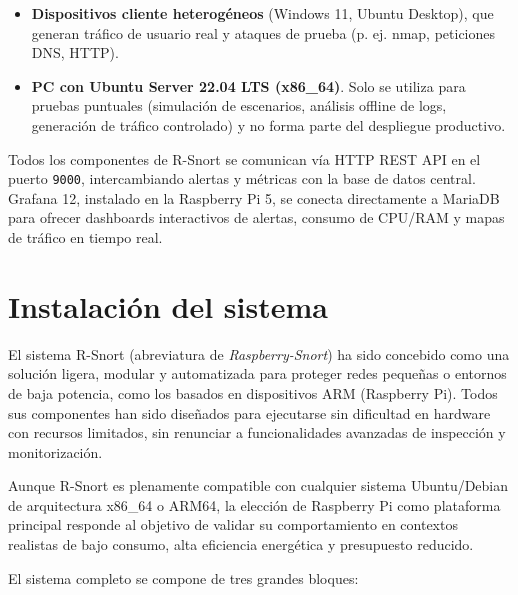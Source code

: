 \documentclass[11pt,a4paper,twoside]{report}
\begin{document}
\begin{itemize}
	\item \textbf{Dispositivos cliente heterogéneos} (Windows 11, Ubuntu Desktop), que generan tráfico de usuario real y ataques de prueba (p. ej. nmap, peticiones DNS, HTTP).
	
	\item \textbf{PC con Ubuntu Server 22.04 LTS (x86\_64)}. Solo se utiliza para pruebas puntuales (simulación de escenarios, análisis offline de logs, generación de tráfico controlado) y no forma parte del despliegue productivo.
\end{itemize}

Todos los componentes de R-Snort se comunican vía HTTP REST API en el puerto \texttt{9000}, intercambiando alertas y métricas con la base de datos central. Grafana 12, instalado en la Raspberry Pi 5, se conecta directamente a MariaDB para ofrecer dashboards interactivos de alertas, consumo de CPU/RAM y mapas de tráfico en tiempo real.

\section{Instalación del sistema}

El sistema R-Snort (abreviatura de \textit{Raspberry-Snort}) ha sido concebido como una solución ligera, modular y automatizada para proteger redes pequeñas o entornos de baja potencia, como los basados en dispositivos ARM (Raspberry Pi). Todos sus componentes han sido diseñados para ejecutarse sin dificultad en hardware con recursos limitados, sin renunciar a funcionalidades avanzadas de inspección y monitorización.\newline

Aunque R-Snort es plenamente compatible con cualquier sistema Ubuntu/Debian de arquitectura x86\_64 o ARM64, la elección de Raspberry Pi como plataforma principal responde al objetivo de validar su comportamiento en contextos realistas de bajo consumo, alta eficiencia energética y presupuesto reducido.\newline

El sistema completo se compone de tres grandes bloques:
\end{document}
